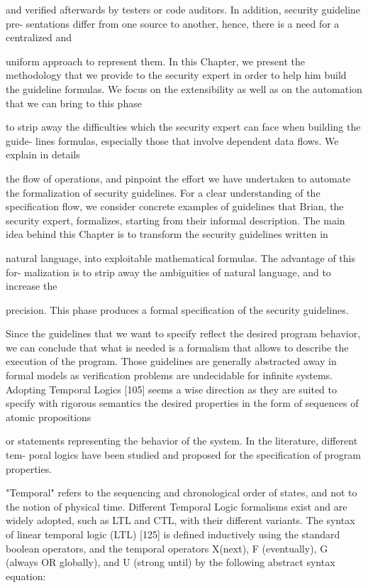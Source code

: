 \documentclass[10pt]{article}
\begin{document}
and verified afterwards by testers or code auditors. In addition, security guideline pre-
sentations differ from one source to another, hence, there is a need for a centralized and

uniform approach to represent them. In this Chapter, we present the methodology that
we provide to the security expert in order to help him build the guideline formulas. We focus on the extensibility as well as on the automation that we can bring to this phase

to strip away the difficulties which the security expert can face when building the guide-
lines formulas, especially those that involve dependent data flows. We explain in details

the flow of operations, and pinpoint the effort we have undertaken to automate the
formalization of security guidelines. For a clear understanding of the specification flow,
we consider concrete examples of guidelines that Brian, the security expert, formalizes,
starting from their informal description.
The main idea behind this Chapter is to transform the security guidelines written in

natural language, into exploitable mathematical formulas. The advantage of this for-
malization is to strip away the ambiguities of natural language, and to increase the

precision. This phase produces a formal specification of the security guidelines.

Since the guidelines that we want to specify reflect the desired program behavior, we
can conclude that what is needed is a formalism that allows to describe the execution
of the program. Those guidelines are generally abstracted away in formal models as
verification problems are undecidable for infinite systems.
Adopting Temporal Logics [105] seems a wise direction as they are suited to specify with
rigorous semantics the desired properties in the form of sequences of atomic propositions

or statements representing the behavior of the system. In the literature, different tem-
poral logics have been studied and proposed for the specification of program properties.

"Temporal" refers to the sequencing and chronological order of states, and not to the
notion of physical time.
Different Temporal Logic formalisms exist and are widely adopted, such as LTL and
CTL, with their different variants. The syntax of linear temporal logic (LTL) [125] is
defined inductively using the standard boolean operators, and the temporal operators
X(next), F (eventually), G (always OR globally), and U (strong until) by the following
abstract syntax equation:
\end{document}

